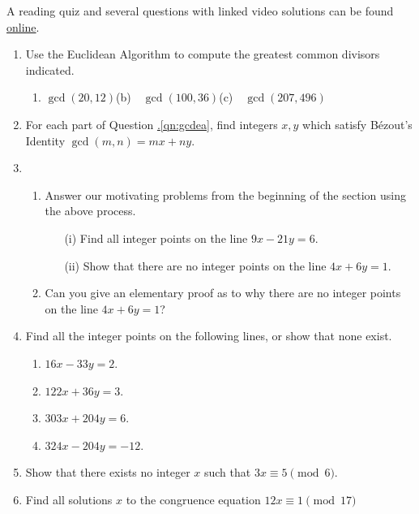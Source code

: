\begin{exercises}{}{}
	A reading quiz and several questions with linked video solutions can be found \href{http://www.math.uci.edu/~ndonalds/math13/selftest/3-2-euclidalg.html}{online}.

\begin{enumerate}
  \item\label{qn:gcdea} Use the Euclidean Algorithm to compute the greatest common divisors indicated.
  \begin{enumerate}
    \item $\gcd(20,12)$\qquad (b)\ \ $\gcd(100,36)$\qquad (c)\ \ $\gcd(207,496)$
  \end{enumerate} 
  
  \item For each part of Question \hyperref[qn:gcdea]{\thesubsection.\ref*{qn:gcdea}}, find integers $x,y$ which satisfy Bézout's Identity $\gcd(m,n)=mx+ny$.
  
  
  \item\begin{enumerate}
    \item Answer our motivating problems from the beginning of the section using the above process.
  		\begin{enumerate}
    		\item[(i)] Find all integer points on the line $9x-21y=6$.
    		\item[(ii)] Show that there are no integer points on the line $4x+6y=1$.
  		\end{enumerate}
  	\item Can you give an elementary proof as to why there are no integer points on the line $4x+6y=1$?
  \end{enumerate} 
  
	\item Find all the integer points on the following lines, or show that none exist.
    \begin{enumerate}
      \item $16x-33y=2$.
      \item $122x+36y=3$.
      \item $303x+204y=6$.
      \item $324x-204y=-12$.
    \end{enumerate}
  
  \item Show that there exists no integer $x$ such that $3x\equiv 5\pmod 6$.
  
  \item Find all solutions $x$ to the congruence equation $12x\equiv 1\pmod{17}$
    

\end{enumerate}
\end{exercises}
